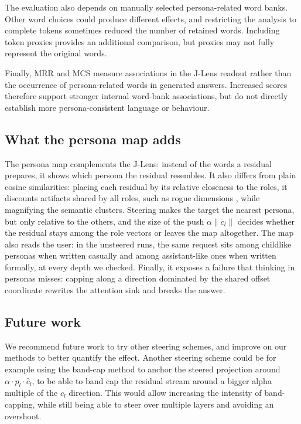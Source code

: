 The evaluation also depends on manually selected persona-related word banks. Other word choices could produce different effects, and restricting the analysis to complete tokens sometimes reduced the number of retained words. Including token proxies provides an additional comparison, but proxies may not fully represent the original words.

Finally, MRR and MCS measure associations in the J-Lens readout rather than the occurrence of persona-related words in generated answers. Increased scores therefore support stronger internal word-bank associations, but do not directly establish more persona-consistent language or behaviour.


\subsection{What the persona map adds}
The persona map complements the J-Lens: instead of the words a residual prepares, it shows which persona the residual resembles.
It also differs from plain cosine similarities: placing each residual by its relative closeness to the roles,
it discounts artifacts shared by all roles, such as rogue dimensions \citep{timkeyAllBarkNo2021}, while magnifying the semantic clusters.
Steering makes the target the nearest persona, but only relative to the others,
and the size of the push $\alpha \lVert c_l \rVert$ decides whether the residual stays among the role vectors or leaves the map altogether.
The map also reads the user: in the unsteered runs, the same request sits among childlike personas when written casually
and among assistant-like ones when written formally, at every depth we checked.
Finally, it exposes a failure that thinking in personas misses:
capping along a direction dominated by the shared offset coordinate rewrites the attention sink and breaks the answer.

\subsection{Future work}
We recommend future work to try other steering schemes, and improve on our methods to better quantify the effect. Another steering scheme could be for example using the band-cap method to anchor the steered projection around $\alpha \cdot p_l \cdot \hat{c}_l$, to be able to band cap the residual stream around a bigger alpha multiple of the $c_l$ direction. This would allow increasing the intensity of band-capping, while still being able to steer over multiple layers and avoiding an overshoot.

